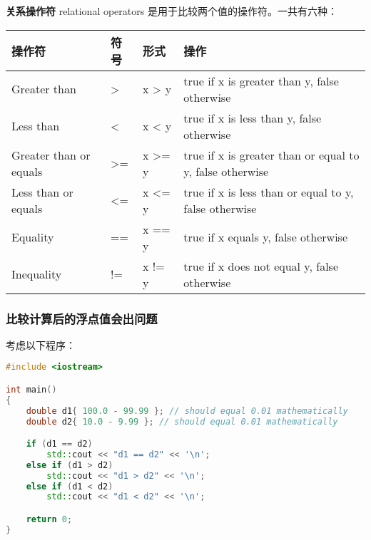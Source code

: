 \documentclass[../../LearnCpp.tex]{subfiles}
\begin{document}

\textbf{关系操作符} relational operators 是用于比较两个值的操作符。一共有六种：

\begin{center}
    \begin{tiny}
        \begin{tabularx}{ 1\textwidth}{
                | >{\raggedright\arraybackslash}X
                | >{\raggedright\arraybackslash}X
                | >{\raggedright\arraybackslash}X
                | >{\raggedright\arraybackslash}X |
            }
            \hline
            操作符                    & 符号 & 形式     & 操作                                                       \\
            \hline
            Greater than           & >  & x > y  & true if x is greater than y, false otherwise             \\
            Less than              & <  & x < y  & true if x is less than y, false otherwise                \\
            Greater than or equals & >= & x >= y & true if x is greater than or equal to y, false otherwise \\
            Less than or equals    & <= & x <= y & true if x is less than or equal to y, false otherwise    \\
            Equality               & == & x == y & true if x equals y, false otherwise                      \\
            Inequality             & != & x != y & true if x does not equal y, false otherwise              \\
            \hline
        \end{tabularx}
    \end{tiny}
\end{center}

\subsubsection*{比较计算后的浮点值会出问题}

考虑以下程序：

\begin{lstlisting}[language=C++]
#include <iostream>

int main()
{
    double d1{ 100.0 - 99.99 }; // should equal 0.01 mathematically
    double d2{ 10.0 - 9.99 }; // should equal 0.01 mathematically

    if (d1 == d2)
        std::cout << "d1 == d2" << '\n';
    else if (d1 > d2)
        std::cout << "d1 > d2" << '\n';
    else if (d1 < d2)
        std::cout << "d1 < d2" << '\n';

    return 0;
}
\end{lstlisting}
\end{document}
